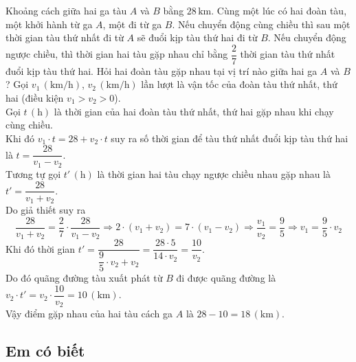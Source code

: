 \begin{bt}%
Khoảng cách giữa hai ga tàu $A$ và $B$ bằng $28\, \mathrm{km}$. Cùng một lúc có hai đoàn tàu, một khởi hành từ ga $A$, một đi từ ga $B$. Nếu chuyển động cùng chiều thì sau một thời gian tàu thứ nhất đi từ $A$ sẽ đuổi kịp tàu thứ hai đi từ $B$. Nếu chuyển động ngược chiều, thì thời gian hai tàu gặp nhau chỉ bằng $\dfrac{2}{7}$ thời gian tàu thứ nhất đuổi kịp tàu thứ hai. Hỏi hai đoàn tàu gặp nhau tại vị trí nào giữa hai ga $A$ và $B$?
	\loigiai
	{Gọi $v_{1}\, \left(\mathrm{km}/\mathrm{h}\right)$, $v_{2}\, \left(\mathrm{km}/\mathrm{h}\right)$ lần lượt là vận tốc của đoàn tàu thứ nhất, thứ hai (điều kiện $v_{1} > v_{2}> 0$).\\
	Gọi $t\, (\mathrm{h})$ là thời gian của hai đoàn tàu thứ nhất, thứ hai gặp nhau khi chạy cùng chiều.\\	
	Khi đó $v_{1}\cdot t = 28 + v_{2}\cdot t$ suy ra số thời gian để tàu thứ nhất đuổi kịp tàu thứ hai là $t  = \dfrac{28}{v_{1} - v_{2}}$.\\
Tương tự gọi $t'\, (\mathrm{h})$ là thời gian hai tàu chạy ngược chiều nhau  gặp nhau là $t' = \dfrac{28}{v_{1} + v_{2}}$.\\ 
Do giả thiết suy ra 
$$\dfrac{28}{v_{1} + v_{2}} = \dfrac{2}{7}\cdot \dfrac{28}{v_{1} - v_{2}}\Rightarrow 2\cdot \left(v_{1} + v_{2}\right) = 7\cdot \left(v_{1} - v_{2}\right)\Rightarrow \dfrac{v_{1}}{v_{2}} = \dfrac{9}{5}\Rightarrow v_{1} = \dfrac{9}{5}\cdot v_{2}$$
Khi đó thời gian $t' = \dfrac{28}{\dfrac{9}{5}\cdot v_{2} + v_{2}} = \dfrac{28\cdot 5}{14\cdot v_{2}} =  \dfrac{10}{v_{2}}$.\\
Do đó quãng đường tàu xuất phát từ $B$ đi được quãng đường là $v_{2}\cdot t' =  v_{2}\cdot \dfrac{10}{v_{2}} = 10\, \left(\mathrm{km}\right)$.\\
Vậy điểm gặp nhau của hai tàu cách ga $A$ là $28 - 10 = 18\, \left(\mathrm{km}\right)$. 
}		
\end{bt}

\subsection{Em có biết}
